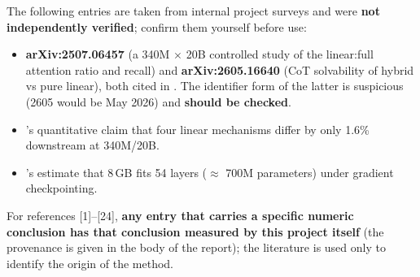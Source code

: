 The following entries are taken from internal project surveys and were \textbf{not
independently verified}; confirm them yourself before use:

\begin{itemize}
\item \textbf{arXiv:2507.06457} (a 340M $\times$ 20B controlled study of the linear:full
      attention ratio and recall) and \textbf{arXiv:2605.16640} (CoT solvability of hybrid vs
      pure linear), both cited in . The identifier form of the latter is
      suspicious (2605 would be May 2026) and \textbf{should be checked}.
\item {}'s quantitative claim that four linear mechanisms differ by only 1.6\%
      downstream at 340M/20B.
\item {}'s estimate that 8\,GB fits 54 layers ($\approx$ 700M parameters) under
      gradient checkpointing.
\end{itemize}

For references [1]--[24], \textbf{any entry that carries a specific numeric conclusion has
that conclusion measured by this project itself} (the provenance is given in the body of the
report); the literature is used only to identify the origin of the method.

